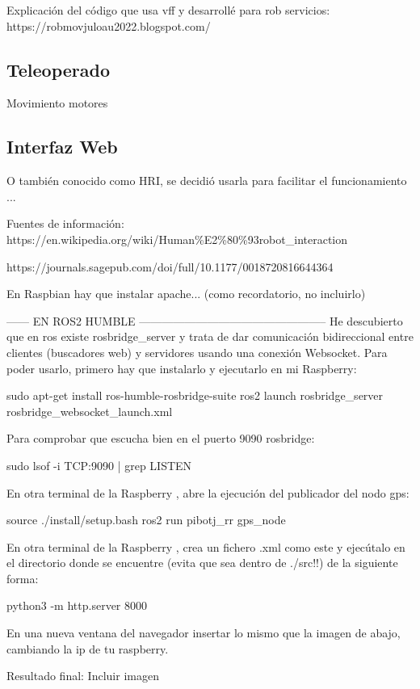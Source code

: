 Explicación del código que usa vff y desarrollé para rob servicios: https://robmovjuloau2022.blogspot.com/


\subsection{Teleoperado}
\label{subsec:teleoperado}

Movimiento motores

\subsection{Interfaz Web}
\label{subsec:softwareweb}

O también conocido como HRI, se decidió usarla para facilitar el funcionamiento ...

Fuentes de información: 
https://en.wikipedia.org/wiki/Human\%E2\%80\%93robot\_interaction

https://journals.sagepub.com/doi/full/10.1177/0018720816644364


En Raspbian  hay que instalar apache... (como recordatorio, no incluirlo)


------ EN ROS2 HUMBLE --------------------------------------------------
He descubierto que en ros existe rosbridge\_server y trata de dar comunicación bidireccional entre clientes (buscadores web) y servidores usando una conexión Websocket. Para poder usarlo, primero hay que instalarlo y ejecutarlo en mi Raspberry:

sudo apt-get install ros-humble-rosbridge-suite
ros2 launch rosbridge\_server rosbridge\_websocket\_launch.xml

Para comprobar que escucha bien en el puerto 9090 rosbridge:

sudo lsof -i TCP:9090 | grep LISTEN

En otra terminal de la Raspberry , abre la ejecución del publicador del nodo gps:

source ./install/setup.bash
ros2 run pibotj\_rr gps\_node

En otra terminal de la Raspberry , crea un fichero .xml como este y ejecútalo en el directorio donde se encuentre (evita que sea dentro de ./src!!) de la siguiente forma:

python3 -m http.server 8000

En una nueva ventana del navegador insertar lo mismo que la imagen de abajo, cambiando la ip de tu raspberry.

Resultado final: Incluir imagen


